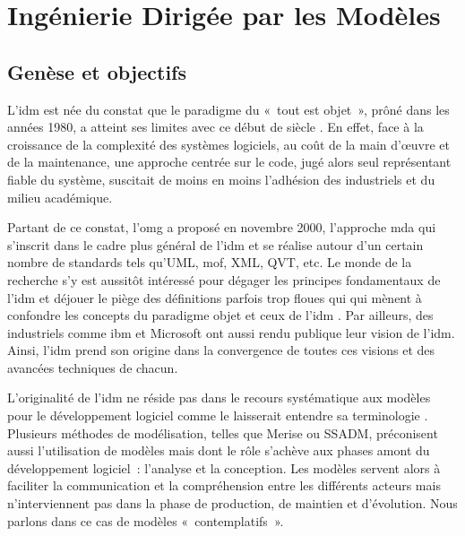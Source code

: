\chapter{Ingénierie Dirigée par les Modèles}
\label{ch:IDM}
 
\PartialToc

\section{Genèse et objectifs}

L'\gls{idm} est née du constat que le paradigme du «~tout est objet~», prôné dans les années 1980, a atteint ses limites avec ce début de siècle \cite{greenfield2004software}. En effet, face à la croissance de la complexité des systèmes logiciels, au coût de la main d'œuvre et de la maintenance, une approche centrée sur le code, jugé alors seul représentant 
fiable du système, suscitait de moins en moins l'adhésion des industriels et du 
milieu académique. 

Partant de ce constat, l'\gls{omg} a proposé en novembre 
2000, l'approche \gls{mda} qui s'inscrit dans le cadre 
plus général de l'\gls{idm} et se réalise autour d'un certain nombre de standards tels 
qu'UML, \gls{mof}, XML, QVT, etc. Le monde de la recherche s'y est aussitôt intéressé 
pour dégager les principes fondamentaux de l'\gls{idm} 
\cite{bezivin2001towards, kent2002model, de2002using} et déjouer le 
piège des définitions parfois trop floues qui qui mènent à confondre les 
concepts du paradigme objet et ceux de l'\gls{idm} \cite{bezivin2004search}. Par 
ailleurs, des industriels comme \gls{ibm} \cite{booch2004mda} et Microsoft 
\cite{greenfield2004software} ont aussi rendu publique leur vision de l'\gls{idm}. 
Ainsi, l'\gls{idm} prend son origine dans la convergence de toutes ces visions et des 
avancées techniques de chacun.

L'originalité de l'\gls{idm} ne réside pas dans le recours systématique aux modèles 
pour le développement logiciel comme le laisserait entendre sa terminologie  
\cite{bezivin2004rapport}. Plusieurs méthodes de modélisation, telles que Merise 
ou SSADM, préconisent aussi l'utilisation de modèles mais dont le rôle s'achève aux 
phases amont du développement logiciel~: l'analyse et la conception. Les modèles 
servent alors à faciliter la communication et la compréhension entre les différents 
acteurs mais n'interviennent pas dans la phase de production, de maintien et 
d'évolution. Nous parlons dans ce cas de modèles «~contemplatifs~». 

